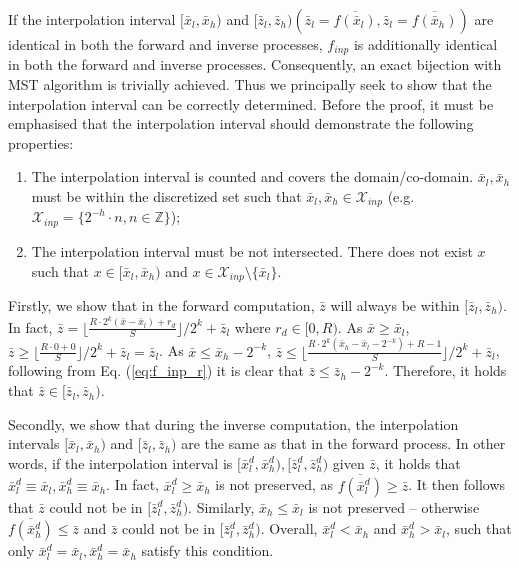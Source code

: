 \documentclass{article}
\newcommand{\quant}[1]{\bar{#1}}
\begin{document}
If the interpolation interval $[\quant{x}_l, \quant{x}_h)$ and $[\quant{z}_l, \quant{z}_h) (\quant{z}_l = \overline{f(\quant{x}_l)}, \quant{z}_l = \overline{f(\quant{x}_h)})$ are identical in both the forward and inverse processes, $f_{inp}$ is additionally identical in both the forward and inverse processes. Consequently, an exact bijection with MST algorithm is trivially achieved. Thus we principally seek to show that the interpolation interval can be correctly determined. Before the proof, it must be emphasised that the interpolation interval should demonstrate the following properties:
\begin{enumerate}
    \item The interpolation interval is counted and covers the domain/co-domain. $\quant{x}_l, \quant{x}_h$ must be within the discretized set such that $\quant{x}_l, \quant{x}_h \in \mathcal{X}_{inp}$ (e.g. $\mathcal{X}_{inp} = \{2^{-h}\cdot n, n \in \mathbb{Z}\}$);
    \item The interpolation interval must be not intersected. There does not exist $x$ such that $x \in [\quant{x}_l, \quant{x}_h)$ and $x \in \mathcal{X}_{inp} \setminus \{\quant{x}_l\}$. 
\end{enumerate}

Firstly, we show that in the forward computation, $\quant{z}$ will always be within $[\quant{z}_l, \quant{z}_h)$. In fact, $\quant{z} = \lfloor \frac{R \cdot 2^k (\quant{x} - \quant{x}_l) + r_d}{S} \rfloor / 2^k + \quant{z}_l$ where $r_d \in [0, R)$. As $\quant{x} \ge \quant{x}_l$, $\quant{z} \ge \lfloor \frac{R \cdot 0 + 0}{S} \rfloor / 2^k + \quant{z}_l = \quant{z}_l$. As $\quant{x} \le \quant{x}_h - 2^{-k}$, $\quant{z} \le \lfloor \frac{R \cdot 2^k (\quant{x}_h - \quant{x}_l - 2^{-k}) + R - 1}{S} \rfloor / 2^k + \quant{z}_l$, following from Eq. (\ref{eq:f_inp_r}) it is clear that $\quant{z} \le \quant{z}_h - 2^{-k}$. Therefore, it holds that $\quant{z} \in [\quant{z}_l, \quant{z}_h)$.

Secondly, we show that during the inverse computation, the interpolation intervals $[\quant{x}_l, \quant{x}_h)$ and $[\quant{z}_l, \quant{z}_h)$ are the same as that in the forward process. In other words, if the interpolation interval is $[\quant{x}_l^d, \quant{x}_h^d), [\quant{z}_l^d, \quant{z}_h^d)$ given $\quant{z}$, it holds that $\quant{x}_l^d \equiv \quant{x}_l, \quant{x}_h^d \equiv \quant{x}_h$. In fact, $\quant{x}_l^d \ge \quant{x}_h$ is not preserved, as $\overline{f(\quant{x}_l^d)} \ge \quant{z}$. It then follows that $\quant{z}$ could not be in $[\quant{z}_l^d, \quant{z}_h^d)$. Similarly, $\quant{x}_h \le \quant{x}_l$ is not preserved -- otherwise $\overline{f(\quant{x}_h^d)} \le \quant{z}$ and $\quant{z}$ could not be in $[\quant{z}_l^d, \quant{z}_h^d)$. Overall, $\quant{x}_l^d < \quant{x}_h$ and $\quant{x}_h^d > \quant{x}_l$, such that only $\quant{x}_l^d = \quant{x}_l, \quant{x}_h^d = \quant{x}_h$ satisfy this condition.
\end{document}
